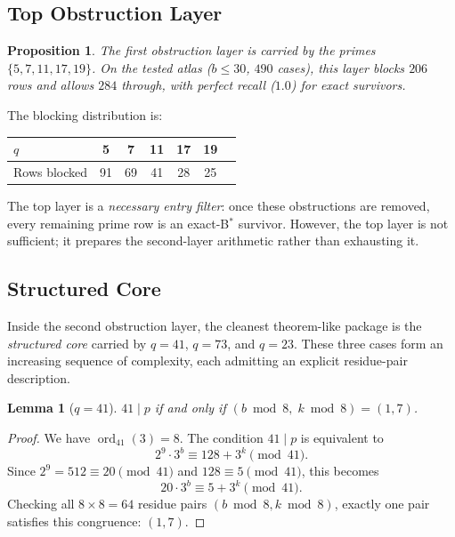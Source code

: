 \documentclass[11pt,letterpaper]{article}
\newtheorem{lemma}[theorem]{Lemma}
\newtheorem{proposition}[theorem]{Proposition}
\begin{document}
\subsection{Top Obstruction Layer}

\begin{proposition}\label{prop:toplayer}
The first obstruction layer is carried by the primes $\{5, 7, 11, 17, 19\}$.
On the tested atlas ($b \leq 30$, $490$ cases), this layer blocks $206$ rows and allows $284$ through, with perfect recall ($1.0$) for exact survivors.
\end{proposition}

The blocking distribution is:
\begin{center}
\begin{tabular}{@{}lcccccc@{}}
\toprule
$q$ & 5 & 7 & 11 & 17 & 19 \\
\midrule
Rows blocked & 91 & 69 & 41 & 28 & 25 \\
\bottomrule
\end{tabular}
\end{center}

The top layer is a \emph{necessary entry filter}: once these obstructions are removed, every remaining prime row is an exact-B$^\ast$ survivor.
However, the top layer is not sufficient; it prepares the second-layer arithmetic rather than exhausting it.

\subsection{Structured Core}\label{sec:core}

Inside the second obstruction layer, the cleanest theorem-like package is the \emph{structured core} carried by $q = 41$, $q = 73$, and $q = 23$.
These three cases form an increasing sequence of complexity, each admitting an explicit residue-pair description.

\begin{lemma}[$q = 41$]\label{lem:q41}
$41 \mid p$ if and only if $(b \bmod 8,\; k \bmod 8) = (1, 7)$.
\end{lemma}

\begin{proof}
We have $\operatorname{ord}_{41}(3) = 8$.
The condition $41 \mid p$ is equivalent to
\begin{equation}
    2^9 \cdot 3^b \equiv 128 + 3^k \pmod{41}.
\end{equation}
Since $2^9 = 512 \equiv 20 \pmod{41}$ and $128 \equiv 5 \pmod{41}$, this becomes
\begin{equation}
    20 \cdot 3^b \equiv 5 + 3^k \pmod{41}.
\end{equation}
Checking all $8 \times 8 = 64$ residue pairs $(b \bmod 8, k \bmod 8)$, exactly one pair satisfies this congruence: $(1, 7)$.
\end{proof}
\end{document}

